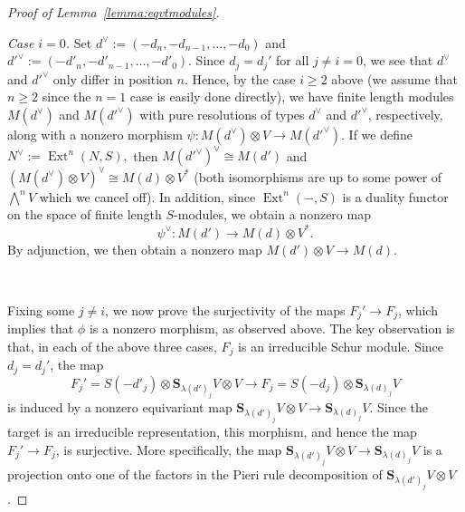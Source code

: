 \documentclass[12pt]{amsart}
\theoremstyle{definition}
\newcommand{\Ext}{\operatorname{Ext}} %
\newcommand{\Sc}{\mathbf{S}}
\begin{document}
\begin{proof}[Proof of Lemma~\ref{lemma:eqvtmodules}]
  ~
  
  \noindent \emph{Case $i=0$.} Set $d^\vee:= (-d_n, -d_{n-1}, \dots,
  -d_0)$ and $d'^{\vee}:=(-d'_n, -d'_{n-1}, \dots, -d'_0)$.  Since
  $d_j=d_j'$ for all $j\ne i=0$, we see that $d^\vee$ and $d'^\vee$
  only differ in position $n$.  Hence, by the case $i\geq 2$ above (we
  assume that $n \ge 2$ since the $n=1$ case is easily done directly),
  we have finite length modules $M(d^\vee)$ and $M(d'^{\vee})$ with
  pure resolutions of types $d^\vee$ and $d'^\vee$, respectively,
  along with a nonzero morphism $\psi \colon M(d^\vee)\otimes V \to
  M(d'^\vee)$.  If we define $N^\vee:= \Ext^n(N,S),$ then
  $M(d'^\vee)^\vee \cong M(d')$ and $(M(d^\vee)\otimes V)^\vee \cong
  M(d) \otimes V^*$ (both isomorphisms are up to some power of
  $\bigwedge^n V$ which we cancel off). In addition, since
  $\Ext^n(-,S)$ is a duality functor on the space of finite length
  $S$-modules, we obtain a nonzero map
  \[
  \psi^\vee \colon M(d')\to M(d)\otimes V^*.
  \]
  By adjunction, we then obtain a nonzero map $M(d')\otimes V\to
  M(d)$.

  ~
    
  Fixing some $j\ne i$, we now prove the surjectivity of the maps $F_j'\to F_j$, which implies that $\phi$ is a nonzero morphism, as observed above.  The key observation is that,
  in each of the above three cases, $F_j$ is an irreducible Schur module.  Since $d_j=d_j'$, the map
  \[
  F_j'=S(-d'_j)\otimes \Sc_{\lambda(d')_j}V\otimes V\to F_j=S(-d_j)\otimes \Sc_{\lambda(d)_j}V
  \]
  is induced by a nonzero equivariant map $\Sc_{\lambda(d')_j}V\otimes V\to  \Sc_{\lambda(d)_j}V$.  Since the target
  is an irreducible representation, this morphism, and hence the map $F_j'\to F_j$, is surjective.  More specifically, the map  $\Sc_{\lambda(d')_j}V\otimes V\to  \Sc_{\lambda(d)_j}V$ is a projection onto one of the factors in the Pieri rule decomposition of $\Sc_{\lambda(d')_j}V\otimes V$.
\end{proof}
\end{document}
